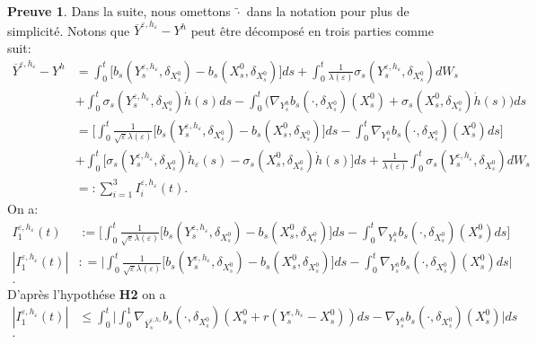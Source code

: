 \documentclass[12pt,a4paper,twoside]{report}%
\theoremstyle{definition}
\newtheorem*{pr}{\textbf{Preuve}}
\numberwithin{equation}{section}
\begin{document}
\begin{pr}
	 Dans la suite, nous omettons $\widetilde{\cdot}$ dans la notation pour plus de simplicité. Notons que $\overline{Y}^{\varepsilon,h_\varepsilon} - Y^h$ peut être décomposé en trois parties comme suit:
	 \[
	 \begin{aligned}
	 	\overline{Y}^{\varepsilon,h_\varepsilon} - Y^h &=\int_{0}^{t}\Big[b_s(Y_s^{\varepsilon,h_\varepsilon},\delta_{X_{s}^{0}}) - b_s(X_s^0,\delta_{X_{s}^{0}})\Big]ds + \int_{0}^{t}\frac{1}{\lambda(\varepsilon)}\sigma_s(Y_s^{\varepsilon,h_\varepsilon},\delta_{X_{s}^{0}})dW_s \\&+\int_{0}^{t} \sigma_s(Y_s^{\varepsilon,h_\varepsilon},\delta_{X_{s}^{0}})\dot{h}(s)ds - \int_{0}^{t}\Big(\nabla_{Y_s^h}b_s(\cdot,\delta_{X_{s}^{0}})(X_s^0)+\sigma_{s}(X_s^0,\delta_{X_{s}^{0}})\dot{h}(s)\Big)ds\\
	 	&=\Bigg[ \int_{0}^{t}\frac{1}{\sqrt{\varepsilon}\lambda(\varepsilon)}\Big[b_s(Y_s^{\varepsilon,h_\varepsilon},\delta_{X_{s}^{0}})-b_s(X_s^0,\delta_{X_s^0})\Big]ds - \int_{0}^{t}\nabla_{Y_s^h}b_s(\cdot,\delta_{X_{s}^{0}})(X_s^0)ds\Bigg]\\
	 	&+\int_{0}^{t}\Big[\sigma_s(Y_s^{\varepsilon,h_\varepsilon},\delta_{X_{s}^{0}})\dot{h}_\varepsilon(s)-\sigma_{s}(X_s^0,\delta_{X_{s}^{0}})\dot{h}(s)\Big]ds+\frac{1}{\lambda(\varepsilon)}\int_{0}^{t}\sigma_{s}(Y_s^{\varepsilon,h_\varepsilon},\delta_{X_s^0})dW_s\\
	 	&=:\sum_{i=1}^{3}I_i^{\varepsilon,h_\varepsilon}(t).
	 \end{aligned}
	 \]
	 On a:
	 \[
	 \begin{aligned}
	 I_1^{\varepsilon,h_\varepsilon}(t)&:=\Bigg[ \int_{0}^{t}\frac{1}{\sqrt{\varepsilon}\lambda(\varepsilon)}\Big[b_s(Y_s^{\varepsilon,h_\varepsilon},\delta_{X_{s}^{0}})-b_s(X_s^0,\delta_{X_s^0})\Big]ds - \int_{0}^{t}\nabla_{Y_s^h}b_s(\cdot,\delta_{X_{s}^{0}})(X_s^0)ds\Bigg]\\
	 |I_1^{\varepsilon,h_\varepsilon}(t)| &: = \Bigg| \int_{0}^{t}\frac{1}{\sqrt{\varepsilon}\lambda(\varepsilon)}\Big[b_s(Y_s^{\varepsilon,h_\varepsilon},\delta_{X_{s}^{0}})-b_s(X_s^0,\delta_{X_s^0})\Big]ds - \int_{0}^{t}\nabla_{Y_s^h}b_s(\cdot,\delta_{X_{s}^{0}})(X_s^0)ds\Bigg|\\.
	 	\end{aligned}
	 \]
	 D'après l'hypothése \textbf{H2} on a
	 \[
	 \begin{aligned}
	 |I_1^{\varepsilon,h_\varepsilon}(t)| &\leq \int_{0}^{t}\Bigg|\int_{0}^{1}\nabla_{\overline{Y}_s^{\varepsilon,h_\varepsilon}}b_s(\cdot,\delta_{X_{s}^{0}})(X_s^0+r(Y_s^{\varepsilon,h_\varepsilon}-X_s^0))ds - \nabla_{Y_s^h}b_s(\cdot,\delta_{X_{s}^{0}})(X_s^0)\Bigg|ds\\.

\end{aligned}\]
\end{pr}
\end{document}
